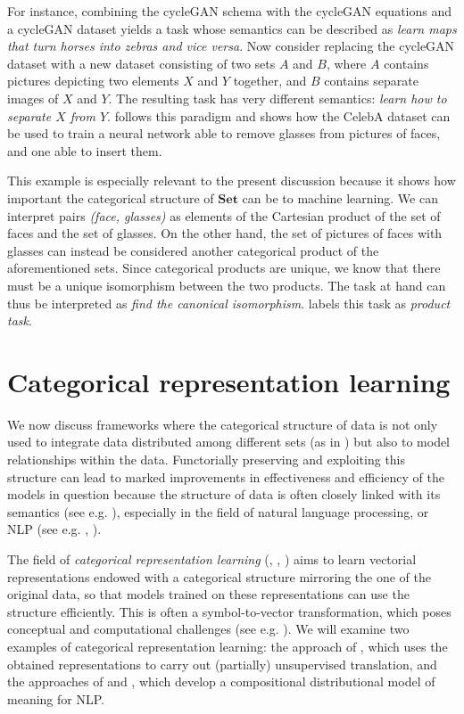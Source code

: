 \documentclass[11pt,a4paper,openright,twoside]{report}
\theoremstyle{plain}
\theoremstyle{definition}
\begin{document}
For instance, combining the cycleGAN schema with the cycleGAN equations and a cycleGAN dataset yields a task whose semantics can be described as \textit{learn maps that turn horses into zebras and vice versa}. Now consider replacing the cycleGAN dataset with a new dataset consisting of two sets $A$ and $B$, where $A$ contains pictures depicting two elements $X$ and $Y$ together, and $B$ contains separate images of $X$ and $Y$. The resulting task has very different semantics: \textit{learn how to separate $X$ from $Y$}. \cite{gavranovic2019compositional} follows this paradigm and shows how the CelebA dataset can be used to train a neural network able to remove glasses from pictures of faces, and one able to insert them.

This example is especially relevant to the present discussion because it shows how important the categorical structure of $\mathbf{Set}$ can be to machine learning. We can interpret pairs \textit{(face, glasses)} as elements of the Cartesian product of the set of faces and the set of glasses. On the other hand, the set of pictures of faces with glasses can instead be considered another categorical product of the aforementioned sets. Since categorical products are unique, we know that there must be a unique isomorphism between the two products. The task at hand can thus be interpreted as \textit{find the canonical isomorphism}. \cite{gavranovic2019compositional} labels this task as \textit{product task}.

\section{Categorical representation learning}

We now discuss frameworks where the categorical structure of data is not only used to integrate data distributed among different sets (as in \cite{gavranovic2019compositional}) but also to model relationships within the data. Functorially preserving and exploiting this structure can lead to marked improvements in effectiveness and efficiency of the models in question  because the structure of data is often closely linked with its semantics (see e.g. \cite{sheshmani2021categorical}), especially in the field of natural language processing, or NLP (see e.g. \cite{coecke2010mathematical}, \cite{lewis2019compositionality}). 

The field of \textit{categorical representation learning} (\cite{coecke2010mathematical}, \cite{lewis2019compositionality}, \cite{sheshmani2021categorical}) aims to learn vectorial representations endowed with a categorical structure mirroring the one of the original data, so that models trained on these representations can use the structure efficiently. This is often a symbol-to-vector transformation, which poses conceptual and computational challenges (see e.g. \cite{coecke2010mathematical}). We will examine two examples of categorical representation learning: the approach of \cite{sheshmani2021categorical}, which uses the obtained representations to carry out (partially) unsupervised translation, and the approaches of \cite{coecke2010mathematical} and \cite{lewis2019compositionality}, which develop a compositional distributional model of meaning for NLP.
\end{document}
